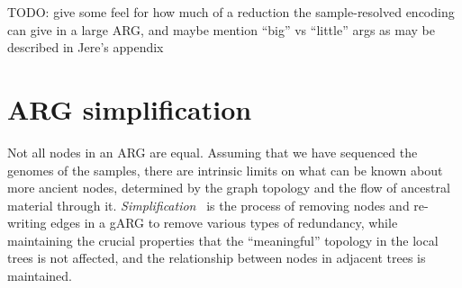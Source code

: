 \documentclass{article}
\begin{document}
TODO: give some feel for how much of a reduction the sample-resolved encoding can give in a large ARG, and
maybe mention ``big'' vs ``little'' args as may be described in Jere's appendix




\section*{ARG simplification}\label{ARG_simplification}

Not all nodes in an ARG are equal. Assuming that we have sequenced the
genomes of the samples, there are intrinsic limits on what can
be known about more ancient nodes, determined by the graph topology
and the flow of ancestral material through it.
\emph{Simplification}~\citep{kelleher2018efficient} is the process
of removing nodes and re-writing edges in a gARG to remove
various types of redundancy, while maintaining the crucial properties
that the ``meaningful'' topology in the local trees is not affected,
and the relationship between nodes in adjacent trees is maintained.
\end{document}
